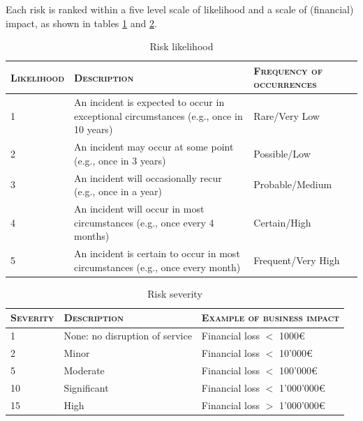 Each risk is ranked within a five level scale of likelihood and a scale of (financial) impact, as shown in tables \ref{tab:likelihood} and \ref{tab:severity}.

\begin{table}[H]
    \centering
    \begin{tabular}{|p{2cm}|p{6.5cm}|p{5cm}|}
         \hline
         \textsc{Likelihood} & \textsc{Description} & \textsc{Frequency of occurrences} \\
         \hline
         1 & An incident is expected to occur in exceptional circumstances (e.g., once in 10 years) & Rare/Very Low \\
         \hline
         2 & An incident may occur at some point (e.g., once in 3 years) & Possible/Low \\
         \hline
         3 & An incident will occasionally recur (e.g., once in a year) & Probable/Medium \\
         \hline
         4 & An incident will occur in most circumstances (e.g., once every 4 months) & Certain/High \\
         \hline
         5 & An incident is certain to occur in most circumstances (e.g., once every month) & Frequent/Very High \\
         \hline
    \end{tabular}
    \caption{Risk likelihood}
    \label{tab:likelihood}
\end{table}

\begin{table}[H]
    \centering
    \begin{tabular}{|p{2cm}|p{5.5cm}|p{6cm}|}
        \hline
        \textsc{Severity} & \textsc{Description} & \textsc{Example of business impact} \\
        \hline
        1 & None: no disruption of service & Financial loss $<$ 1000€ \\
        \hline
        2 & Minor & Financial loss $<$ 10'000€ \\
        \hline
        5 & Moderate & Financial loss $<$ 100'000€ \\
        \hline
        10 & Significant & Financial loss $<$ 1'000'000€ \\
        \hline
        15 & High & Financial loss $>$ 1'000'000€ \\
        \hline
    \end{tabular}
    \caption{Risk severity}
    \label{tab:severity}
\end{table}

